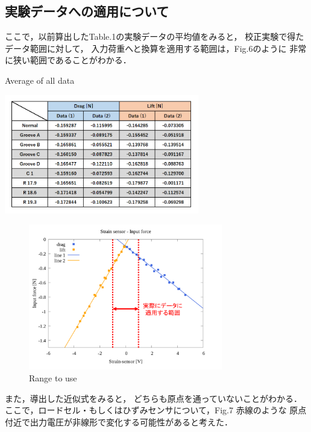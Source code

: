 \documentclass[twocolumn,a4j]{jsarticle}
\begin{document}
\subsection{実験データへの適用について}

ここで，以前算出したTable.1の実験データの平均値をみると，
校正実験で得たデータ範囲に対して，
入力荷重へと換算を適用する範囲は，Fig.6のように
非常に狭い範囲であることがわかる．

\begin{table}[htbp]
    \footnotesize
    \caption{Average of all data}
    \begin{center}
        \includegraphics[width=85mm]{../images/Table_2.png}
    \end{center}
\end{table}

\begin{figure}[htbp]
    \footnotesize
    \begin{center}
        \includegraphics[width=85mm]{../images/image_08.png}
        \caption{Range to use}
    \end{center}
\end{figure}

また，導出した近似式をみると，
どちらも原点を通っていないことがわかる．
ここで，ロードセル・もしくはひずみセンサについて，Fig.7 赤線のような
原点付近で出力電圧が非線形で変化する可能性があると考えた．
\end{document}
